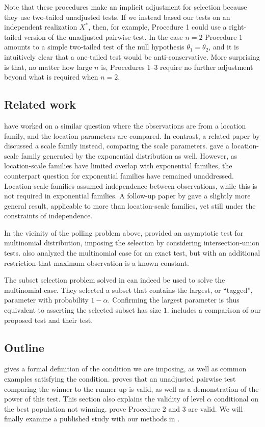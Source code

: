 \documentclass[11pt]{article}
\begin{document}
Note that these procedures make an implicit adjustment for selection because they use two-tailed unadjusted tests. If we instead based our tests on an independent realization $X^*$, then, for example, Procedure 1 could use a right-tailed version of the unadjusted pairwise test. In the case $n = 2$ Procedure 1 amounts to a simple two-tailed test of the null hypothesis $\theta_1 = \theta_2$, and it is intuitively clear that a one-tailed test would be anti-conservative. More surprising is that, no matter how large $n$ is, Procedures 1--3 require no further adjustment beyond what is required when $n = 2$. 

\subsection{Related work}

\citet{Gutmann:1987fk} have worked on a similar question where the observations are from a location family, and the location parameters are compared. In contrast, a related paper by \citet{Karnnan:2009iv} discussed a scale family instead, comparing the scale parameters. \citet{Bofinger:1991hv} gave a location-scale family generated by the exponential distribution as well. However, as location-scale families have limited overlap with exponential families, the counterpart question for exponential families have remained unaddressed. Location-scale families assumed independence between observations, while this is not required in exponential families. A follow-up paper by \citet{Maymin:1992fz} gave a slightly more general result, applicable to more than location-scale families, yet still under the constraints of independence.

In the vicinity of the polling problem above, \citet{Nettleton:2009ht} provided an asymptotic test for multinomial distribution, imposing the selection by considering intersection-union tests. \citet{Ng:2007cn} also analyzed the multinomial case for an exact test, but with an additional restriction that maximum observation is a known constant.

The subset selection problem solved in \citet{Gupta:1967wg} can indeed be used to solve the multinomial case. They selected a subset that contains the largest, or ``tagged'', parameter with probability $1-\alpha$. Confirming the largest parameter is thus equivalent to asserting the selected subset has size $1$.  includes a comparison of our proposed test and their test.

\subsection{Outline}
 gives a formal definition of the condition we are imposing, as well as common examples satisfying the condition.  proves that an unadjusted pairwise test comparing the winner to the runner-up is valid, as well as a demonstration of the power of this test. This section also explains the validity of level $\alpha$ conditional on the best population not winning.  prove Procedure 2 and 3 are valid. We will finally examine a published study with our methods in .
\end{document}
